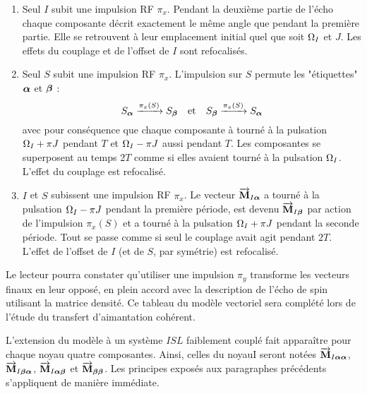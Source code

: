 \begin{enumerate}
\item Seul $I$ subit une impulsion RF $\pi_x$. Pendant la deuxième partie de l'écho
chaque composante décrit exactement le même angle que pendant la première partie.
Elle se retrouvent à leur emplacement initial quel que soit $\Omega_I$ et $J$.
Les effets du couplage et de l'offset de $I$ sont refocalisés.
\item Seul $S$ subit une impulsion RF $\pi_x$. L'impulsion sur $S$ permute les
"étiquettes" $\boldsymbol{\alpha}$ et $\boldsymbol{\beta}$ :
\begin{equation}
S_{\boldsymbol{\alpha}} \xrightarrow{\pi_x(S)} S_{\boldsymbol{\beta}}
\quad \mbox{et} \quad
S_{\boldsymbol{\beta}} \xrightarrow{\pi_x(S)} S_{\boldsymbol{\alpha}}
\end{equation}
avec pour conséquence que chaque composante à tourné à la pulsation
$\Omega_I + \pi J$ pendant $T$ et $\Omega_I - \pi J$ aussi pendant $T$.
Les composantes se superposent au temps $2T$ comme si elles avaient tourné
à la pulsation $\Omega_I$.
L'effet du couplage est refocalisé.
\item $I$ et $S$ subissent une impulsion RF $\pi_x$.
Le vecteur $\overrightarrow{\mathbf{M}}_{I\boldsymbol{\alpha}}$ a tourné à la pulsation $\Omega_I - \pi J$ pendant
la première période, est devenu $\overrightarrow{\mathbf{M}}_{I\boldsymbol{\beta}}$ par action de l'impulsion
$\pi_x(S)$ et a tourné à la pulsation $\Omega_I + \pi J$ pendant
la seconde période. 
Tout se passe comme si seul le couplage avait agit pendant $2T$.
L'effet de l'offset de $I$ (et de $S$, par symétrie) est refocalisé.
\end{enumerate}

Le lecteur pourra constater qu'utiliser une impulsion $\pi_y$ transforme les
vecteurs finaux en leur opposé, en plein accord avec la description
de l'écho de spin utilisant la matrice densité.
Ce tableau du modèle vectoriel sera complété lors de l'étude du transfert
d'aimantation cohérent.

L'extension du modèle à un système $ISL$ faiblement couplé fait apparaître
pour chaque noyau quatre composantes.
Ainsi, celles du noyau$ $I seront notées $\overrightarrow{\mathbf{M}}_{I\boldsymbol{\alpha}\boldsymbol{\alpha}}$,
$\overrightarrow{\mathbf{M}}_{I\boldsymbol{\beta}\boldsymbol{\alpha}}$, $\overrightarrow{\mathbf{M}}_{I\boldsymbol{\alpha}\boldsymbol{\beta}}$ et $\overrightarrow{\mathbf{M}}_{\boldsymbol{\beta}\boldsymbol{\beta}}$.
Les principes exposés aux paragraphes précédents s'appliquent
de manière immédiate.
